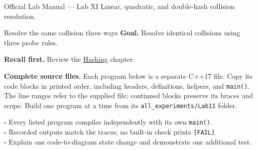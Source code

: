 
\begin{sourcealignment}{Official Lab Manual --- Lab XI}
Linear, quadratic, and double-hash collision resolution.
\end{sourcealignment}

\begin{labproject}{Resolve the same collision three ways}
\textbf{Goal.} Resolve identical collisions using three probe rules.

\textbf{Recall first.} Review the \hyperref[ch:hashing]{Hashing} chapter.

\textbf{Complete source files.} Each program below is a separate C++17 file.
Copy its code blocks in printed order, including headers, definitions, helpers, and \texttt{main()}.
The line ranges refer to the supplied file; continued blocks preserve its braces and scope.
Build one program at a time from its \texttt{all\_experiments/Lab11} folder.


\end{labproject}

\begin{verification}
$\square$ Every listed program compiles independently with its own \texttt{main()}.\\
$\square$ Recorded outputs match the traces; no built-in check prints \texttt{[FAIL]}.\\
$\square$ Explain one code-to-diagram state change and demonstrate one additional test.
\end{verification}
